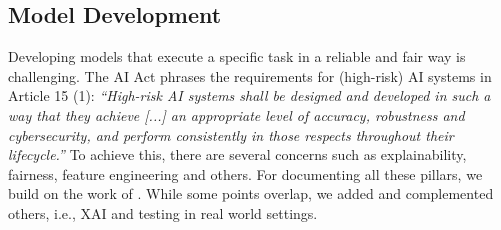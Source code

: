 \pagebreak 

\subsection{Model Development}
Developing models that execute a specific task in a reliable and fair way is challenging. The AI Act phrases the requirements for (high-risk) AI systems in Article 15 (1): \emph{``High-risk AI systems shall be designed and developed in such a way that they achieve [...] an appropriate level of accuracy, robustness and cybersecurity, and perform consistently in those respects throughout their lifecycle.''} To achieve this, there are several concerns such as explainability, fairness, feature engineering and others. %
For documenting all these pillars, we build on the work of \citet{Mitchell2019_ModelCards}. While some points overlap, we added  and complemented others, i.e., \ac{XAI} and testing in real world settings. %

